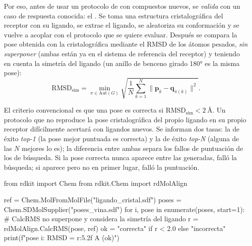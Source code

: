 Por eso, antes de usar un protocolo de  con compuestos nuevos, se \emph{valida} con un caso de respuesta conocida: el . Se toma una estructura cristalográfica del receptor con su ligando, se extrae el ligando, se aleatoriza su conformación y se vuelve a acoplar con el protocolo que se quiere evaluar. Después se compara la pose obtenida con la cristalográfica mediante el RMSD de los átomos pesados, \emph{sin superponer} (ambas están ya en el sistema de referencia del receptor) y teniendo en cuenta la simetría del ligando (un anillo de benceno girado \ang{180} es la misma pose):
\begin{equation}\label{eq:15-rmsdsim}
\mathrm{RMSD}_{\mathrm{sim}}=\min_{\pi\in\mathrm{Aut}(G)}\sqrt{\frac1{N}\sum_{k=1}^{N}\big\lVert\mathbf p_k-\mathbf q_{\pi(k)}\big\rVert^2}.
\end{equation}

\begin{simbolos}
\end{simbolos}

El criterio convencional es que una pose es correcta si $\mathrm{RMSD}_{\mathrm{sim}}<\SI{2}{\angstrom}$. Un protocolo que no reproduce la pose cristalográfica del propio ligando en su propio receptor difícilmente acertará con ligandos nuevos. Se informan dos tasas: la de éxito \emph{top-1} (la pose mejor puntuada es correcta) y la de éxito \emph{top-N} (alguna de las $N$ mejores lo es); la diferencia entre ambas separa los fallos de puntuación de los de búsqueda. Si la pose correcta nunca aparece entre las generadas, falló la búsqueda; si aparece pero no en primer lugar, falló la puntuación.

\begin{codigo}
from rdkit import Chem
from rdkit.Chem import rdMolAlign

ref = Chem.MolFromMolFile("ligando_cristal.sdf")
poses = Chem.SDMolSupplier("poses_vina.sdf")
for i, pose in enumerate(poses, start=1):
    # CalcRMS no superpone y considera la simetría del ligando
    r = rdMolAlign.CalcRMS(pose, ref)
    ok = "correcta" if r < 2.0 else "incorrecta"
    print(f"pose {i}: RMSD = {r:5.2f} A  ({ok})")
\end{codigo}


